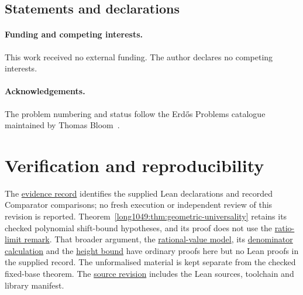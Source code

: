 \documentclass[11pt]{article}
\begin{document}
\subsection*{Statements and declarations}

\paragraph{Funding and competing interests.} This work received no external
funding.  The author declares no competing interests.

\paragraph{Acknowledgements.} The problem numbering and status follow the
Erd\H{o}s Problems catalogue maintained by Thomas Bloom~\cite{erdosproblems}.


\appendix
\section{Verification and reproducibility}\label{long1049:app:index}

The \href{\evidencerecordurl}{evidence record} identifies the supplied
Lean declarations and recorded Comparator comparisons;
no fresh execution or independent review of this revision is
reported. Theorem~\ref{long1049:thm:geometric-universality}
retains its checked polynomial shift-bound hypotheses, and its
proof does not use the \hyperref[long1049:thm:geometric-ratio]{ratio-limit remark}.
That broader argument, the
\hyperref[long1049:thm:calibrated-model]{rational-value model}, its
\hyperref[long1049:thm:calibrated-denominators]{denominator calculation}
and the \hyperref[long1049:prop:calibrated-height]{height bound}
have ordinary proofs here but no Lean proofs in the supplied record. The unformalised material
is kept separate from the checked fixed-base theorem.
The \href{\sourceurl}{source revision} includes the Lean sources,
toolchain and library manifest.
\evidenceparagraph{\evidencerecordurl}
\end{document}
